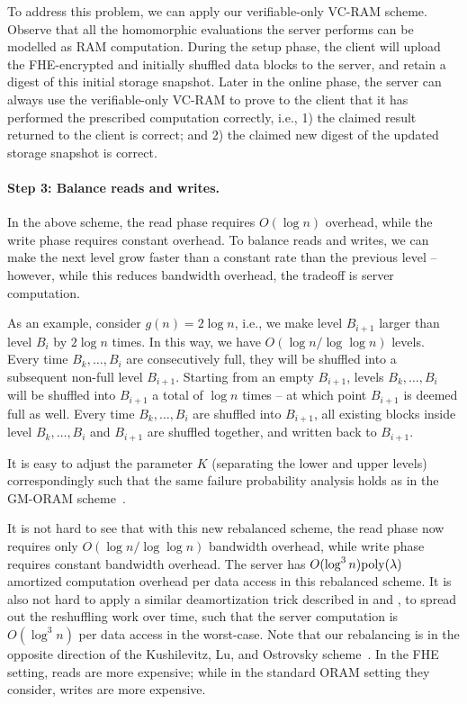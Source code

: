 To address this problem, we can 
apply our verifiable-only VC-RAM
scheme. Observe that all the homomorphic evaluations
the server performs can be modelled as RAM computation. 
During the setup phase, the client will upload the 
FHE-encrypted and initially shuffled data blocks to the server,
and retain a digest of this initial storage snapshot.
Later in the online phase, the server can always 
use the verifiable-only VC-RAM 
to prove to the client that it has performed the prescribed
computation correctly, i.e.,  
1) the claimed result returned to the client is correct; and 
2) the claimed
new digest of the updated storage snapshot is correct.



\paragraph{Step 3: Balance reads and writes.}
In the above scheme, the read phase requires $O(\log n)$
overhead, while 
the write phase requires constant overhead. 
To balance reads and writes, 
we can make the next level grow faster than a constant
rate than the previous level -- however, while this reduces
bandwidth overhead, the tradeoff is server computation.

As an example, consider $g(n) = 2\log n$, i.e., we make level $B_{i+1}$ 
larger than level $B_i$ by $2 \log n$ times.
In this way, we have $O(\log n/\log \log n)$ levels.
Every time $B_k, \ldots, B_i$ are consecutively full, 
they will be shuffled into a subsequent non-full level 
$B_{i+1}$. Starting from an empty $B_{i+1}$, 
levels $B_k, \ldots, B_i$
will be shuffled into $B_{i+1}$  a total of 
$\log n$ times -- at which point $B_{i+1}$ is deemed full as well.
Every time $B_k, \ldots, B_i$ are shuffled into $B_{i+1}$, all existing
blocks inside level $B_k, \ldots, B_i$ and 
$B_{i+1}$ are shuffled together,
and written back to $B_{i+1}$.

It is easy to adjust the parameter $K$ (separating the lower
and upper levels)
correspondingly
such that the same failure probability analysis holds
as in the GM-ORAM scheme~\cite{oram09}.


It is not hard to see that with this new rebalanced scheme, 
the read phase now requires only $O(\log n /\log \log n)$
bandwidth overhead, while write phase requires constant 
bandwidth overhead.
The server has $O(\log^3 n){\rm poly}(\lambda)$  
amortized computation overhead per data access 
in this rebalanced scheme.
It is also not hard to apply a similar deamortization
trick described in \cite{oram02} and \cite{oram03}, to spread
out the reshuffling work over time, such
that the server computation 
is $O(\log^3 n)$ per data access in the worst-case.
Note that our rebalancing is in the opposite direction
of the Kushilevitz, Lu, and Ostrovsky scheme~\cite{oram03}.
In the FHE setting, reads are more expensive; while
in the standard ORAM setting they consider, writes are more expensive.



